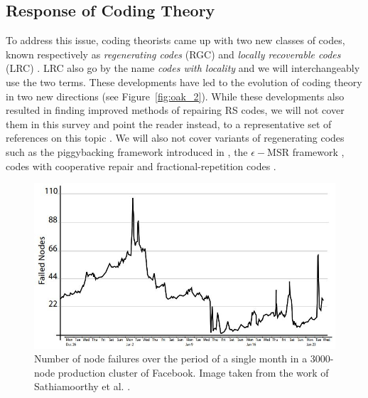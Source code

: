 \begin{multicols}{2}
	\subsection{Response of Coding Theory} \label{sec:response} 
	
	To address this issue, coding theorists came up with two new classes of codes, known respectively as {\em regenerating codes} (RGC) \cite{DimGodWuWaiRam} and {\em locally recoverable codes} (LRC) \cite{GopHuaSimYek}. LRC also go by the name {\em codes with locality} and we will interchangeably use the two terms.  These developments have led to the evolution of coding theory in two new directions (see Figure~\ref{fig:oak_2}).  While these developments also resulted in finding improved methods of repairing RS codes, we will not cover them in this survey and point the reader instead, to a representative set of  references on this topic \cite{ShaPapDimCai,GuruWoot,DauDuuKiaMil}. We will also not cover variants of regenerating codes such as the piggybacking framework introduced in \cite{RasShaRam_piggy}, the $\epsilon-$MSR framework \cite{RawTamGurEfr}, codes with cooperative repair \cite{HuXuWanZhaLi} and fractional-repetition codes \cite{ElRam}.
\end{multicols}


			\begin{figure}[!h]
				\centering
				\includegraphics[scale=.45]{src/Figures/chap4/FB_failures2}  
				\caption{Number of node failures over the period of a single month in a $3000$-node production cluster of Facebook. Image taken from the work of Sathiamoorthy et al. \cite{SathiaAstPap_Xorbas}.}  \label{fig:FB_failures}    
			\end{figure}      

\newpage

